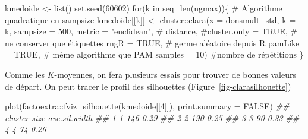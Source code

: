 \documentclass[
  11pt,
  letterpaper,
]{scrbook}
\newenvironment{Shaded}{\begin{snugshade}}{\end{snugshade}}
\newcommand{\AttributeTok}[1]{\textcolor[rgb]{0.40,0.45,0.13}{#1}}
\newcommand{\CommentTok}[1]{\textcolor[rgb]{0.37,0.37,0.37}{#1}}
\newcommand{\ConstantTok}[1]{\textcolor[rgb]{0.56,0.35,0.01}{#1}}
\newcommand{\ControlFlowTok}[1]{\textcolor[rgb]{0.00,0.23,0.31}{#1}}
\newcommand{\DecValTok}[1]{\textcolor[rgb]{0.68,0.00,0.00}{#1}}
\newcommand{\DocumentationTok}[1]{\textcolor[rgb]{0.37,0.37,0.37}{\textit{#1}}}
\newcommand{\FunctionTok}[1]{\textcolor[rgb]{0.28,0.35,0.67}{#1}}
\newcommand{\NormalTok}[1]{\textcolor[rgb]{0.00,0.23,0.31}{#1}}
\newcommand{\OtherTok}[1]{\textcolor[rgb]{0.00,0.23,0.31}{#1}}
\newcommand{\SpecialCharTok}[1]{\textcolor[rgb]{0.37,0.37,0.37}{#1}}
\newcommand{\StringTok}[1]{\textcolor[rgb]{0.13,0.47,0.30}{#1}}
\theoremstyle{definition}
\theoremstyle{remark}
\begin{document}
\begin{Shaded}
\begin{Highlighting}[]
\NormalTok{kmedoide }\OtherTok{\textless{}{-}} \FunctionTok{list}\NormalTok{()}
\FunctionTok{set.seed}\NormalTok{(}\DecValTok{60602}\NormalTok{)}
\ControlFlowTok{for}\NormalTok{(k }\ControlFlowTok{in} \FunctionTok{seq\_len}\NormalTok{(ngmax))\{}
  \CommentTok{\# Algorithme quadratique en sampsize}
\NormalTok{kmedoide[[k]] }\OtherTok{\textless{}{-}}\NormalTok{ cluster}\SpecialCharTok{::}\FunctionTok{clara}\NormalTok{(}\AttributeTok{x =}\NormalTok{ donsmult\_std,}
               \AttributeTok{k =}\NormalTok{ k,}
               \AttributeTok{sampsize =} \DecValTok{500}\NormalTok{,}
               \AttributeTok{metric =} \StringTok{"euclidean"}\NormalTok{, }\CommentTok{\# distance,}
               \CommentTok{\#cluster.only = TRUE, \# ne conserver que étiquettes}
               \AttributeTok{rngR =} \ConstantTok{TRUE}\NormalTok{, }\CommentTok{\# germe aléatoire depuis R}
               \AttributeTok{pamLike =} \ConstantTok{TRUE}\NormalTok{, }\CommentTok{\# même algorithme que PAM}
               \AttributeTok{samples =} \DecValTok{10}\NormalTok{) }\CommentTok{\#nombre de répétitions}
\NormalTok{\}}
\end{Highlighting}
\end{Shaded}

Comme les \(K\)-moyennes, on fera plusieurs essais pour trouver de
bonnes valeurs de départ. On peut tracer le profil des silhouettes
(Figure~\ref{fig-clarasilhouette})

\begin{Shaded}
\begin{Highlighting}[]
\FunctionTok{plot}\NormalTok{(factoextra}\SpecialCharTok{::}\FunctionTok{fviz\_silhouette}\NormalTok{(kmedoide[[}\DecValTok{4}\NormalTok{]]),}
     \AttributeTok{print.summary =} \ConstantTok{FALSE}\NormalTok{)}
\DocumentationTok{\#\#   cluster size ave.sil.width}
\DocumentationTok{\#\# 1       1  146          0.29}
\DocumentationTok{\#\# 2       2  190          0.25}
\DocumentationTok{\#\# 3       3   90          0.33}
\DocumentationTok{\#\# 4       4   74          0.26}
\end{Highlighting}
\end{Shaded}
\end{document}
